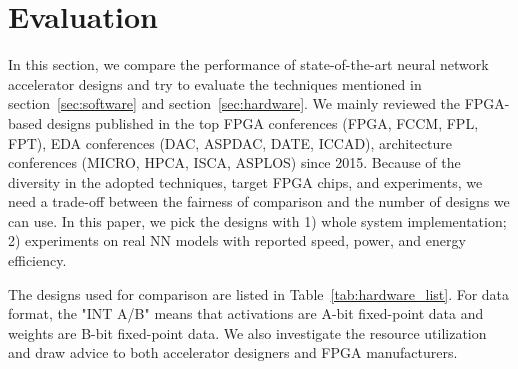 \section{Evaluation}\label{sec:evaluation}

In this section, we compare the performance of state-of-the-art neural network accelerator designs and try to evaluate the techniques mentioned in section~\ref{sec:software} and section~\ref{sec:hardware}. We mainly reviewed the FPGA-based designs published in the top FPGA conferences (FPGA, FCCM, FPL, FPT), EDA conferences (DAC, ASPDAC, DATE, ICCAD), architecture conferences (MICRO, HPCA, ISCA, ASPLOS) since 2015. Because of the diversity in the adopted techniques, target FPGA chips, and experiments, we need a trade-off between the fairness of comparison and the number of designs we can use. In this paper, we pick the designs with 1) whole system implementation; 2) experiments on real NN models with reported speed, power, and energy efficiency.

The designs used for comparison are listed in Table~\ref{tab:hardware_list}. For data format, the "INT A/B" means that activations are A-bit fixed-point data and weights are B-bit fixed-point data. We also investigate the resource utilization and draw advice to both accelerator designers and FPGA manufacturers.




